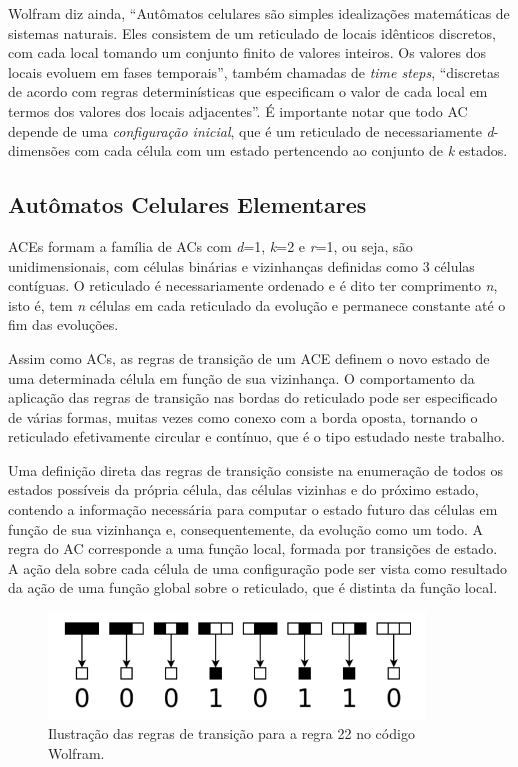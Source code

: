 \documentclass[a4paper,12pt]{ltxdoc}
\newcommand\tab[1][1cm]{\hspace*{#1}}
\begin{document}
\tab Wolfram diz ainda, ``Autômatos celulares são simples idealizações matemáticas de sistemas naturais. Eles consistem de um reticulado de locais idênticos discretos, com cada local tomando um conjunto finito de valores inteiros. Os valores dos locais evoluem em fases temporais'', também chamadas de \textit{time steps}, ``discretas de acordo com regras determinísticas que especificam o valor de cada local em termos dos valores dos locais adjacentes''. É importante notar que todo AC depende de uma \textit{configuração inicial}, que é um reticulado de necessariamente \textit{d}-dimensões com cada célula com um estado pertencendo ao conjunto de \textit{k} estados.

\subsection{Autômatos Celulares Elementares} \label{ref_ace}

ACEs formam a família de ACs com \textit{d}=1, \textit{k}=2 e \textit{r}=1, ou seja, são unidimensionais, com células binárias e vizinhanças definidas como 3 células contíguas. O reticulado é necessariamente ordenado e é dito ter comprimento \textit{n}, isto é, tem \textit{n} células em cada reticulado da evolução e permanece constante até o fim das evoluções.

\tab Assim como ACs, as regras de transição de um ACE definem o novo estado de uma determinada célula em função de sua vizinhança. O comportamento da aplicação das regras de transição nas bordas do reticulado pode ser especificado de várias formas, muitas vezes como conexo com a borda oposta, tornando o reticulado efetivamente circular e contínuo, que é o tipo estudado neste trabalho.

\tab Uma definição direta das regras de transição consiste na enumeração de todos os estados possíveis da própria célula, das células vizinhas e do próximo estado, contendo a informação necessária para computar o estado futuro das células em função de sua vizinhança e, consequentemente, da evolução como um todo. A regra do AC corresponde a uma função local, formada por transições de estado. A ação dela sobre cada célula de uma configuração pode ser vista como resultado da ação de uma função global sobre o reticulado, que é distinta da função local.

\begin{figure}[!htbp]
  \centerline{\includegraphics[width=10cm]{imgs/rule_22.png}}
  \caption{Ilustração das regras de transição para a regra 22 no código Wolfram. }
\end{figure}
\end{document}
